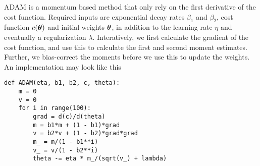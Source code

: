 ADAM is a momentum based method that only rely on the first derivative of the cost function. Required inputs are exponential decay rates $\beta_1$ and $\beta_2$, cost function $c(\boldsymbol{\theta})$ and initial weights $\boldsymbol{\theta}$, in addition to the learning rate $\eta$ and eventually a regularization $\lambda$. Interatively, we first calculate the gradient of the cost function, and use this to calculate the first and second moment estimates. Further, we bias-correct the moments before we use this to update the weights. An implementation may look like this
\lstset{basicstyle=\scriptsize}
\begin{lstlisting}
def ADAM(eta, b1, b2, c, theta):
    m = 0
    v = 0
    for i in range(100):
        grad = d(c)/d(theta)
        m = b1*m + (1 - b1)*grad
        v = b2*v + (1 - b2)*grad*grad
        m_ = m/(1 - b1**i)
        v_ = v/(1 - b2**i)
        theta -= eta * m_/(sqrt(v_) + lambda)
\end{lstlisting}
